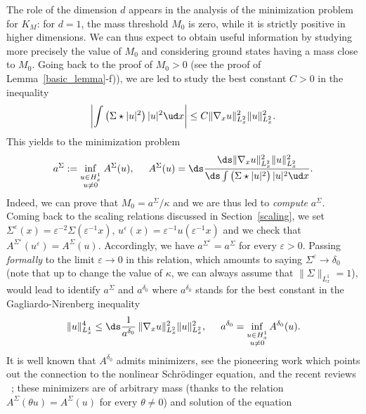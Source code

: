 The role of the dimension $d$ appears in the analysis of the minimization problem for $K_{M}$: for $d=1$, the mass threshold $M_0$ is zero, while it is strictly positive in higher dimensions.
We can thus expect to obtain useful information by
studying more precisely the value of $M_0$ and
considering
ground states having a mass close to $M_{0}$.
Going back to the proof of $M_{0}>0$ (see the proof of Lemma~\ref{basic_lemma}-f)), we are led to study
the best constant $C>0$ in the inequality
\[
\left|\int\big(\Sigma\star|u|^{2}\big)\,|u|^{2}\ud x\right|\leq C\|\nabla_{x}u\|_{L_{x}^{2}}^{2}\|u\|_{L_{x}^{2}}^{2}.
\]
This yields to the minimization problem\vspace*{-5pt}
\[
a^{\Sigma}:=\underset{\substack{u\in H_{x}^{1} \\ u\neq 0}}{\inf}\;A^{\Sigma}(u), \hspace{0.5cm} A^{\Sigma}(u)=\ds\frac{\ds\|\nabla_{x}u\|_{L_{x}^{2}}^{2}\|u\|_{L_{x}^{2}}^{2}}{\ds\int\big(\Sigma\star|u|^{2}\big)\,|u|^{2}\ud x}.
\]
Indeed, we can prove that $M_{0}=a^{\Sigma}/\kappa$ and we are thus led to \emph{compute} $a^{\Sigma}$.
Coming back to the scaling relations discussed in Section~\ref{scaling}, we set $\Sigma^{\varepsilon}(x)=\varepsilon^{-2}\Sigma(\varepsilon^{-1}x)$, $u^{\varepsilon}(x)=\varepsilon^{-1}u(\varepsilon^{-1}x)$ and we check that $A^{\Sigma^{\varepsilon}}(u^{\varepsilon})=A^{\Sigma}(u)$.
Accordingly, we have $a^{\Sigma^{\varepsilon}}=a^{\Sigma}$ for every $\varepsilon>0$. Passing \emph{formally} to the limit $\varepsilon\to 0$ in this relation, which amounts to saying $\Sigma^{\varepsilon}\to\delta_{0}$ (note that up to change the value of $\kappa$, we can always assume that $\|\Sigma\|_{L_{x}^{1}}=1$), would lead to identify $a^{\Sigma}$ and $a^{\delta_{0}}$ where $a^{\delta_{0}}$ stands for the best constant in the Gagliardo-Nirenberg inequality\vspace*{-3pt}
\[
\|u\|_{L_{x}^{4}}^{4}\leq \ds\frac{1}{a^{\delta_{0}}}\,\|\nabla_{x}u\|_{L_{x}^{2}}^{2}\|u\|_{L_{x}^{2}}^{2}, \hspace{0.5cm} a^{\delta_{0}}=\underset{\substack{u\in H_{x}^{1} \\ u\neq 0}}{\inf}\, A^{\delta_{0}}(u).
\]
It is well known that $A^{\delta_{0}}$ admits minimizers, see
the pioneering work \cite[Th.\,B]{weinstein1982} which points out the connection to the nonlinear Schrödinger equation,
and the recent reviews \cite{Bol, DPD}~; these minimizers are of arbitrary mass (thanks to the relation $A^{\Sigma}(\theta u)=A^{\Sigma}(u)$ for every $\theta\neq 0$) and solution of the equation\vspace*{-3pt}
